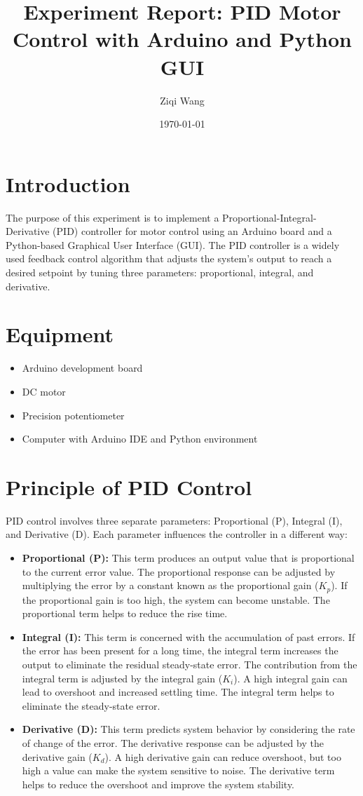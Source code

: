 \documentclass{article}
\title{Experiment Report: PID Motor Control with Arduino and Python GUI}
\author{Ziqi Wang}
\date{\today}
\begin{document}
\maketitle

\section{Introduction}
The purpose of this experiment is to implement a Proportional-Integral-Derivative (PID) controller for motor control using an Arduino board and a Python-based Graphical User Interface (GUI). The PID controller is a widely used feedback control algorithm that adjusts the system's output to reach a desired setpoint by tuning three parameters: proportional, integral, and derivative.

\section{Equipment}
\begin{itemize}
    \item Arduino development board
    \item DC motor
    \item Precision potentiometer
    \item Computer with Arduino IDE and Python environment
\end{itemize}

\section{Principle of PID Control}
PID control involves three separate parameters: Proportional (P), Integral (I), and Derivative (D). Each parameter influences the controller in a different way:

\begin{itemize}
    \item \textbf{Proportional (P):} This term produces an output value that is proportional to the current error value. The proportional response can be adjusted by multiplying the error by a constant known as the proportional gain ($K_p$). If the proportional gain is too high, the system can become unstable. The proportional term helps to reduce the rise time.
    \item \textbf{Integral (I):} This term is concerned with the accumulation of past errors. If the error has been present for a long time, the integral term increases the output to eliminate the residual steady-state error. The contribution from the integral term is adjusted by the integral gain ($K_i$). A high integral gain can lead to overshoot and increased settling time. The integral term helps to eliminate the steady-state error.
    \item \textbf{Derivative (D):} This term predicts system behavior by considering the rate of change of the error. The derivative response can be adjusted by the derivative gain ($K_d$). A high derivative gain can reduce overshoot, but too high a value can make the system sensitive to noise. The derivative term helps to reduce the overshoot and improve the system stability.
\end{itemize}
\end{document}
